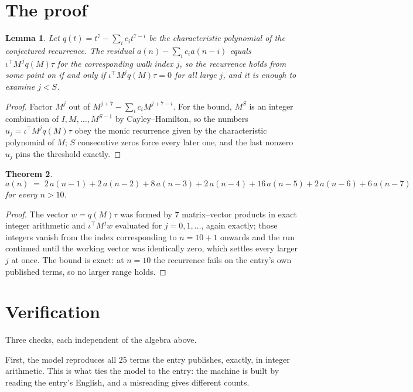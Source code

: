\documentclass[11pt,a4paper]{article}
\theoremstyle{plain}
\newtheorem{theorem}{Theorem}
\newtheorem{lemma}[theorem]{Lemma}
\theoremstyle{definition}
\begin{document}
\section{The proof}

\begin{lemma}\label{lem:crit}
Let $q(t)=t^{7}-\sum_i c_it^{7-i}$ be the characteristic polynomial of the
conjectured recurrence. The residual $a(n)-\sum_ic_ia(n-i)$ equals
$\iota^{\!\top}M^{\,j}q(M)\tau$ for the corresponding walk index $j$, so the recurrence
holds from some point on if and only if $\iota^{\!\top}M^{j}q(M)\tau=0$ for all large $j$,
and it is enough to examine $j<S$.
\end{lemma}

\begin{proof}
Factor $M^{j}$ out of $M^{j+7}-\sum_ic_iM^{j+7-i}$. For the bound, $M^{S}$
is an integer combination of $I,M,\dots,M^{S-1}$ by Cayley--Hamilton, so the numbers
$u_j=\iota^{\!\top}M^{j}q(M)\tau$ obey the monic recurrence given by the characteristic
polynomial of $M$; $S$ consecutive zeros force every later one, and the last nonzero $u_j$
pins the threshold exactly.
\end{proof}

\begin{theorem}
\[
a(n)\;=\;2\,a(n-1) + 2\,a(n-2) + 8\,a(n-3) + 2\,a(n-4) + 16\,a(n-5) + 2\,a(n-6) + 6\,a(n-7)
\]
for every $n>10$.
\end{theorem}

\begin{proof}
The vector $w=q(M)\tau$ was formed by $7$ matrix--vector products in exact integer
arithmetic and $\iota^{\!\top}M^{j}w$ evaluated for $j=0,1,\dots$, again exactly; those
integers vanish from the index corresponding to $n=10+1$ onwards and the run continued
until the working vector was identically zero, which settles every larger $j$ at once. The bound is exact: at $n=10$ the recurrence fails on the entry's own published terms, so no larger range holds.
\end{proof}

\section{Verification}

Three checks, each independent of the algebra above.

First, the model reproduces all $25$ terms the entry publishes, exactly, in integer
arithmetic. This is what ties the model to the entry: the machine is built by reading the
entry's English, and a misreading gives different counts.
\end{document}
